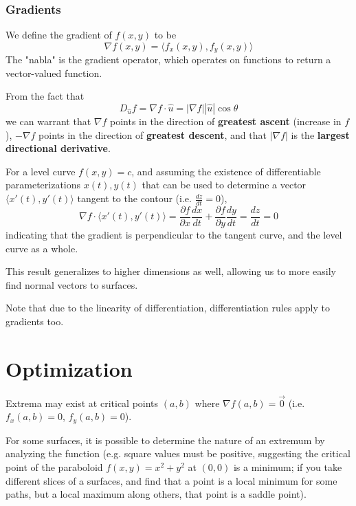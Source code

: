 \documentclass{article}
\newcommand{\vect}[1]{\ensuremath{\overrightarrow{#1}}}
\newcommand{\abs}[1]{\left|#1\right|}
\begin{document}
\subsubsection{Gradients}
We define the gradient of $f(x,y)$ to be
$$\nabla f(x,y) = \langle f_x(x,y), f_y(x,y) \rangle$$
The "nabla" is the gradient operator, which operates on functions to return a vector-valued function.

From the fact that $$D_{\hat{u}}f=\nabla f \cdot \hat{u}=\abs{\nabla f}\abs{\hat{u}}\cos{\theta}$$ we can warrant that $\nabla f$ points in the direction of \textbf{greatest ascent} (increase in $f$), $-\nabla f$ points in the direction of \textbf{greatest descent}, and that $\abs{\nabla f}$ is the \textbf{largest directional derivative}.

For a level curve $f(x,y)=c$, and assuming the existence of differentiable parameterizations $x(t), y(t)$ that can be used to determine a vector $\langle x'(t), y'(t)\rangle$ tangent to the contour (i.e. $\frac{dz}{dt}=0$), $$\nabla{f}\cdot\langle x'(t), y'(t)\rangle=\frac{\partial f}{\partial x}\frac{dx}{dt}+\frac{\partial f}{\partial y}\frac{dy}{dt}=\frac{dz}{dt}=0$$
indicating that the gradient is perpendicular to the tangent curve, and the level curve as a whole.

This result generalizes to higher dimensions as well, allowing us to more easily find normal vectors to surfaces.

Note that due to the linearity of differentiation, differentiation rules apply to gradients too.

\section{Optimization}
Extrema may exist at critical points $(a,b)$ where $\nabla f(a,b) = \vect{0}$ (i.e. $f_x(a,b)=0$, $f_y(a,b)=0$).

For some surfaces, it is possible to determine the nature of an extremum by analyzing the function (e.g. square values must be positive, suggesting the critical point of the paraboloid $f(x,y)=x^2+y^2$ at $(0,0)$ is a minimum; if you take different slices of a surfaces, and find that a point is a local minimum for some paths, but a local maximum along others, that point is a saddle point).
\end{document}
